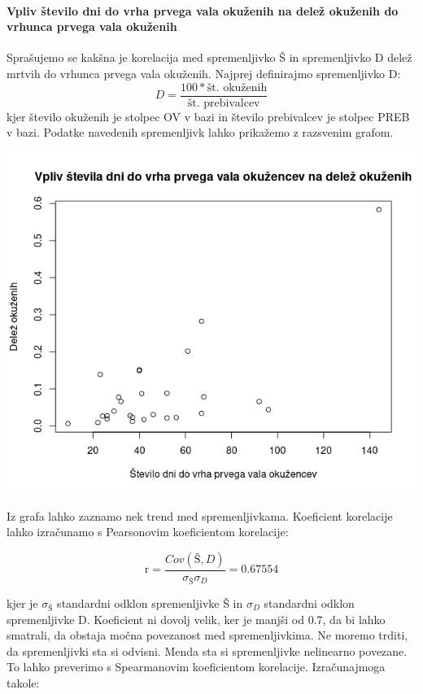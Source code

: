 \documentclass[a4paper,11pt]{article}
\begin{document}
\paragraph{Vpliv število dni do vrha prvega vala okuženih na delež okuženih do vrhunca prvega vala okuženih}
Sprašujemo se kakšna je korelacija med spremenljivko Š in spremenljivko D delež mrtvih do vrhunca prvega vala okuženih. Najprej definirajmo spremenljivko D:
\[D = \frac{100 * \text{št. okuženih}}{\text{št. prebivalcev}}\]
kjer število okuženih je stolpec OV v bazi in število prebivalcev je stolpec PREB v bazi. Podatke navedenih spremenljivk lahko prikažemo z razsvenim grafom.
\\
\begin{center}
\includegraphics[scale=0.6]{vpliv_stevila_dni_do_peaka_okuzencev_na_delez_okuzenih}\\
\end{center}
Iz grafa lahko zaznamo nek trend med spremenljivkama. Koeficient korelacije lahko izračunamo s Pearsonovim koeficientom korelacije:

\begin{center}
\[\text{r} = \frac{Cov(Š,D)}{\sigma_{Š} \sigma_{D}} = 0.67554\]
\end{center} 
kjer je \(\sigma_{Š}\) standardni odklon spremenljivke Š in \(\sigma_{D}\) standardni odklon spremenljivke D. Koeficient ni dovolj velik, ker je manjši od 0.7, da bi lahko smatrali, da obstaja močna povezanost med spremenljivkima. Ne moremo trditi, da spremenljivki sta si odvisni. Menda sta si spremenljivke nelinearno povezane. To lahko preverimo s Spearmanovim koeficientom korelacije. Izračunajmoga takole: 
\end{document}
